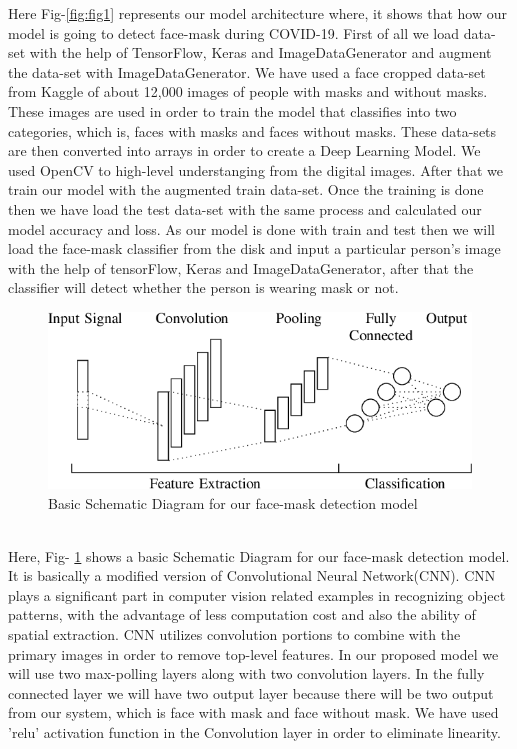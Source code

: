 \documentclass[conference]{IEEEtran}
\begin{document}
Here Fig-\ref{fig:fig1} represents our model architecture where, it shows that how our model is going to detect face-mask during COVID-19. First of all we load data-set with the help of TensorFlow,  Keras and ImageDataGenerator and augment the data-set with ImageDataGenerator. We have used a face cropped data-set from Kaggle of about 12,000 images of people with masks and without masks. These images are used in order to train the model that classifies into two categories, which is, faces with masks and faces without masks. These data-sets are then converted into arrays in order 
to create a Deep Learning Model. We used OpenCV to high-level understanging from the digital images. After that we train our model with the augmented train data-set. Once the training is done then we have load the test data-set with the same process and calculated our model accuracy and loss. As our model is done with train and test then we will load the face-mask classifier from the disk and input a particular person's image with the help of tensorFlow, Keras and ImageDataGenerator, after that the classifier will detect whether the person is wearing mask or not. 

\begin{center}
\begin{figure}[htbp]
  \includegraphics[width=1.0\linewidth]{1-Figure1-1.png}
  \caption{Basic Schematic Diagram for our face-mask detection model }
  \label{fig:fig2}
\end{figure}
\end{center}
\\

Here, Fig- \ref{fig:fig2} shows a basic Schematic Diagram for our face-mask detection model. It is basically a modified version of Convolutional Neural Network(CNN).  CNN plays a significant part in computer vision related examples in recognizing object patterns, with the advantage of  less computation cost and also the ability of spatial extraction. CNN utilizes convolution portions to combine with the primary images in order to remove top-level features. In our proposed model we will use two max-polling layers along with two convolution layers. In the fully connected layer we will have two output layer because there will be two output from our system, which is face with mask and face without mask. We have used 'relu' activation function in the Convolution layer in order to eliminate linearity.
\end{document}
